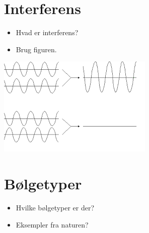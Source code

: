 \documentclass[a4paper, 12pt]{article}
\begin{document}
\section*{Interferens}
\label{sec:orgd0c56b8}
\begin{minipage}{0.3\linewidth}
\begin{itemize}
\item Hvad er interferens?

\item Brug figuren.
\end{itemize}
\end{minipage}
\vline
\begin{minipage}{0.68\linewidth}
\begin{center}
\includegraphics[width=.9\linewidth]{./img/Interferens.png}
\end{center}
\end{minipage}

\vfill

\section*{Bølgetyper}
\label{sec:org62c45b9}

\begin{minipage}{0.3\linewidth}
\begin{itemize}
\item Hvilke bølgetyper er der?

\item Eksempler fra naturen?
\end{itemize}
\end{minipage}
\vline
\begin{minipage}{0.7\linewidth}
\end{minipage}


\vfill
\end{document}
